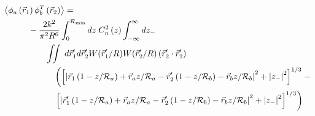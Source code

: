 \begin{equation}\label{tprphase_n4}
\begin{aligned}
&\left\langle \phi_{a}\left(\vec{r}_{1}\right) \phi^{T}_{b}\left(\vec{r}_{2}\right)\right\rangle = \\
&\quad\quad\quad
-\frac{2k^{2}}{\pi^{2}R^{6}} \int_{0}^{\mathcal{R}_{\rm min}} dz\;C_{n}^{2}\left(z\right) 
\int_{-\infty}^{\infty} dz_{-} \\
&\quad\quad\quad\quad\quad 
\iint  \; d\vec{r}^{\prime}_{1}d\vec{r}^{\prime}_{2} W(\vec{r}^{\prime}_{1}/R) W(\vec{r}^{\prime}_{2}/R)
\left(\vec{r}^{\prime}_{2} \cdot \vec{r}^{\prime}_{2}\right)
\\
&\quad\quad\quad\quad\quad\quad
\left(
\left[\left\vert \vec{r}_{1}\left(1-z/\mathcal{R}_{a}\right) + \vec{r}_{a} z/\mathcal{R}_{a} - \vec{r}^{\prime}_{2}\left(1-z/\mathcal{R}_{b}\right) - \vec{r}_{b} z/\mathcal{R}_{b}\right\vert^{2}   + 
\left\vert z_{-} \right\vert^{2}\right]^{1/3}
\right. -
\\
&\quad\quad\quad\quad\quad\quad
\left.
\left[ \left\vert \vec{r}^{\prime}_{1}\left(1-z/\mathcal{R}_{a}\right) + \vec{r}_{a} z/\mathcal{R}_{a} - 
 \vec{r}^{\prime}_{2}\left(1-z/\mathcal{R}_{b}\right) - \vec{r}_{b} z/\mathcal{R}_{b}\right\vert^{2} + 
\left\vert z_{-} \right\vert^{2}\right]^{1/3}
\right)
\end{aligned}
\end{equation}


